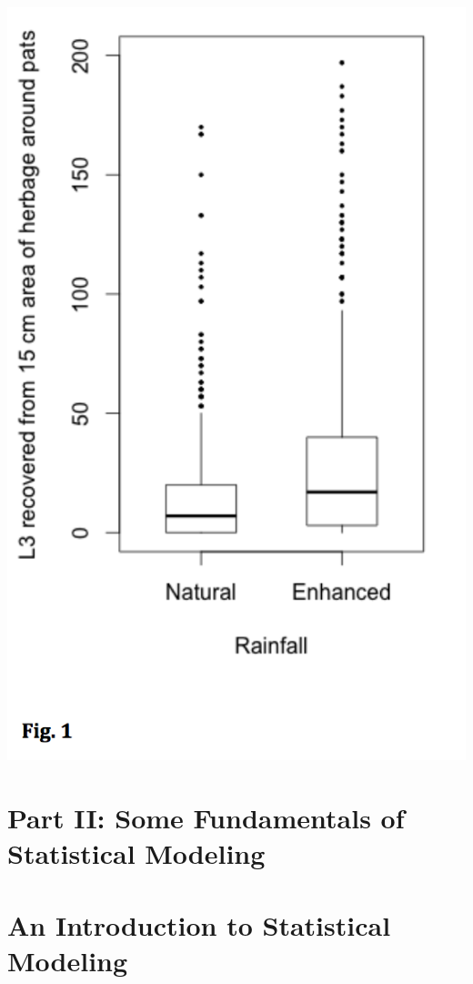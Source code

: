\documentclass[]{book}
\begin{document}
\includegraphics{images/Dung_beetles_reduce_livestock-fig_1.png}

\chapter*{Part II: Some Fundamentals of Statistical
Modeling}\label{part-ii-some-fundamentals-of-statistical-modeling}

\chapter{An Introduction to Statistical
Modeling}\label{an-introduction-to-statistical-modeling}
\end{document}
